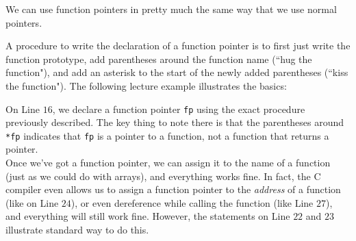 We can use function pointers in pretty much the same way that we use normal pointers. 

A procedure to write the declaration of a function pointer is to first just write the function prototype, add parentheses around the function name (``hug the function"), and add an asterisk  to the start of the newly added parentheses (``kiss the function"). The following lecture example illustrates the basics:


\lstset{
caption=Introduction to Function Pointers}
\begin{center}
\label{Introduction to Function Pointers}
\end{center}


On Line $16$, we declare a function pointer \verb!fp! using the exact procedure previously described. The key thing to note there is that the parentheses around \verb!*fp! indicates that \verb!fp! is a pointer to a function, not a function that returns a pointer. \\

Once we've got a function pointer, we can assign it to the name of a function (just as we could do with arrays), and everything works fine. In fact, the C compiler even allows us to assign a function pointer to the \textit{address} of a function (like on Line $24$), or even dereference while calling the function (like Line $27$), and everything will still work fine. However, the statements on Line $22$ and $23$ illustrate standard way to do this. \\






